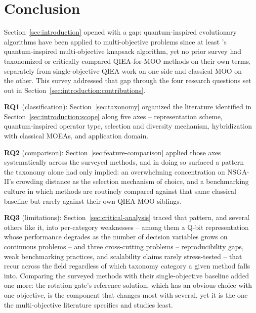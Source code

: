 \section{Conclusion}
\label{sec:conclusion}

Section~\ref{sec:introduction} opened with a gap: quantum-inspired
evolutionary algorithms have been applied to multi-objective problems
since at least \citet{kim2006qmea}'s quantum-inspired multi-objective
knapsack algorithm, yet no prior survey had taxonomized or critically
compared QIEA-for-MOO methods on their own terms, separately from
single-objective QIEA work on one side and classical MOO on the other.
This survey addressed that gap through the four research questions set
out in Section~\ref{sec:introduction:contributions}.

\textbf{RQ1} (classification): Section~\ref{sec:taxonomy} organized the
literature identified in Section~\ref{sec:introduction:scope} along five
axes -- representation scheme, quantum-inspired operator type,
selection and diversity mechanism, hybridization with classical MOEAs,
and application domain.

\textbf{RQ2} (comparison): Section~\ref{sec:feature-comparison} applied
those axes systematically across the surveyed methods, and in doing so
surfaced a pattern the taxonomy alone had only implied: an overwhelming
concentration on NSGA-II's crowding distance as the selection mechanism
of choice, and a benchmarking culture in which methods are routinely
compared against that same classical baseline but rarely against their
own QIEA-MOO siblings.

\textbf{RQ3} (limitations): Section~\ref{sec:critical-analysis} traced
that pattern, and several others like it, into per-category weaknesses
-- among them a Q-bit representation whose performance degrades as the
number of decision variables grows on continuous problems -- and three
cross-cutting problems -- reproducibility gaps, weak benchmarking
practices, and scalability claims rarely stress-tested -- that recur
across the field regardless of which taxonomy category a given method
falls into. Comparing the surveyed methods with their single-objective
baseline added one more: the rotation gate's reference solution, which
has an obvious choice with one objective, is the component that changes
most with several, yet it is the one the multi-objective literature
specifies and studies least.

